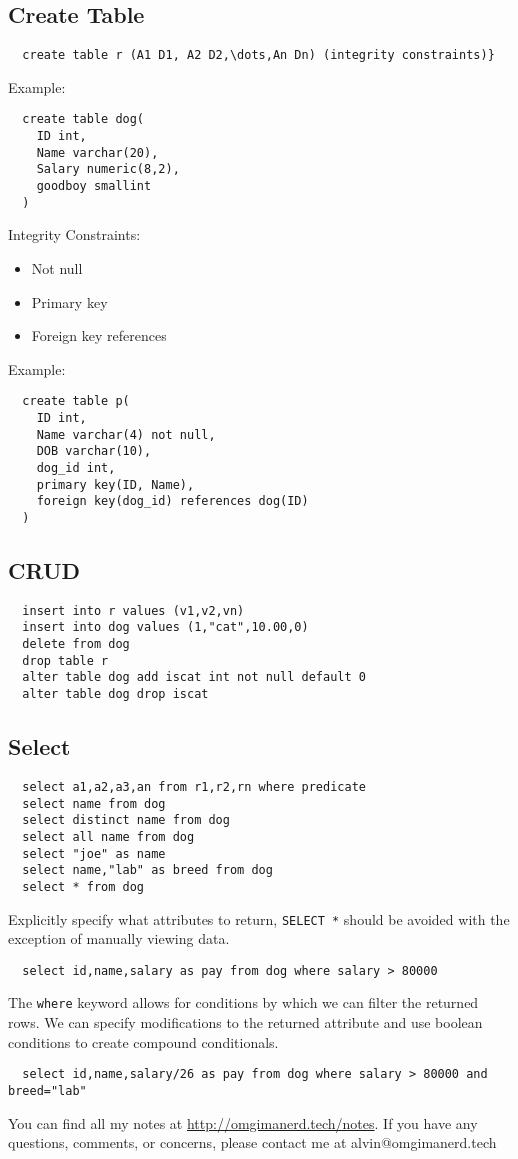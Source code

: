\documentclass{math}
\begin{document}
\subsection*{Create Table}
\begin{lstlisting}
  create table r (A1 D1, A2 D2,\dots,An Dn) (integrity constraints)}
\end{lstlisting}
Example:
\begin{lstlisting}
  create table dog(
    ID int,
    Name varchar(20),
    Salary numeric(8,2),
    goodboy smallint
  )
\end{lstlisting}
Integrity Constraints:
\begin{itemize}
  \item Not null
  \item Primary key
  \item Foreign key references
\end{itemize}
Example:
\begin{lstlisting}
  create table p(
    ID int,
    Name varchar(4) not null,
    DOB varchar(10),
    dog_id int,
    primary key(ID, Name),
    foreign key(dog_id) references dog(ID)
  )
\end{lstlisting}

\subsection*{CRUD}
\begin{lstlisting}
  insert into r values (v1,v2,vn)
  insert into dog values (1,"cat",10.00,0)
  delete from dog
  drop table r
  alter table dog add iscat int not null default 0
  alter table dog drop iscat
\end{lstlisting}

\subsection*{Select}
\begin{lstlisting}
  select a1,a2,a3,an from r1,r2,rn where predicate
  select name from dog
  select distinct name from dog
  select all name from dog
  select "joe" as name
  select name,"lab" as breed from dog
  select * from dog
\end{lstlisting}
Explicitly specify what attributes to return, \texttt{SELECT *} should be
avoided with the exception of manually viewing data.
\begin{lstlisting}
  select id,name,salary as pay from dog where salary > 80000
\end{lstlisting}
The \texttt{where} keyword allows for conditions by which we can filter the
returned rows. We can specify modifications to the returned attribute and use
boolean conditions to create compound conditionals.
\begin{lstlisting}
  select id,name,salary/26 as pay from dog where salary > 80000 and breed="lab"
\end{lstlisting}

\begin{center}
  You can find all my notes at \url{http://omgimanerd.tech/notes}. If you have
  any questions, comments, or concerns, please contact me at
  alvin@omgimanerd.tech
\end{center}
\end{document}
